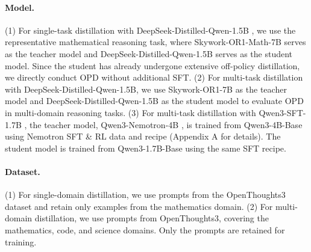 \documentclass{article} %
\renewcommand{\cite}[1]{\citep{#1}}
\begin{document}
\paragraph{Model.}
(1) For single-task distillation with DeepSeek-Distilled-Qwen-1.5B \cite{zhang2025100}, we use the representative mathematical reasoning task, where Skywork-OR1-Math-7B \cite{he2025skywork} serves as the teacher model and DeepSeek-Distilled-Qwen-1.5B serves as the student model. Since the student has already undergone extensive off-policy distillation, we directly conduct OPD without additional SFT.
(2) For multi-task distillation with DeepSeek-Distilled-Qwen-1.5B, we use Skywork-OR1-7B \cite{he2025skywork} as the teacher model and DeepSeek-Distilled-Qwen-1.5B as the student model to evaluate OPD in multi-domain reasoning tasks.
(3) For multi-task distillation with Qwen3-SFT-1.7B \cite{wang2026mix}, the teacher model, Qwen3-Nemotron-4B \cite{wang2026mix}, is trained from Qwen3-4B-Base \cite{yang2025qwen3} using Nemotron SFT \& RL data and recipe (Appendix A for details). The student model is trained from Qwen3-1.7B-Base using the same SFT recipe.

\paragraph{Dataset.}
(1) For single-domain distillation, we use prompts from the OpenThoughts3 dataset \cite{guha2025openthoughts} and retain only examples from the mathematics domain.
(2) For multi-domain distillation, we use prompts from OpenThoughts3, covering the mathematics, code, and science domains. Only the prompts are retained for training.
\end{document}
